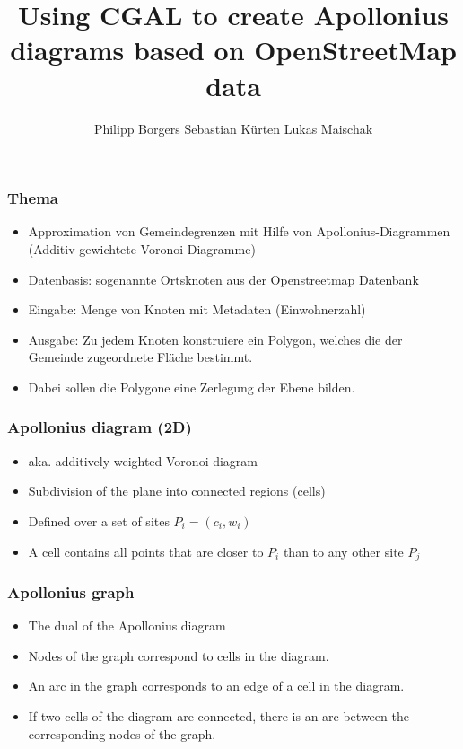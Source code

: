 \documentclass{beamer}
\title{Using CGAL to create Apollonius diagrams based on OpenStreetMap data}
\author[Sebastian Kürten, Philipp Borgers, Lukas Maischak]{
    Philipp Borgers
    \newline Sebastian Kürten
    \newline Lukas Maischak
}
\begin{document}
\begin{frame}
    \titlepage
\end{frame}

\begin{frame}
    \frametitle{Thema}
    \begin{itemize}
        \item Approximation von Gemeindegrenzen mit Hilfe von Apollonius-Diagrammen
        (Additiv gewichtete Voronoi-Diagramme)
        \item Datenbasis: sogenannte Ortsknoten aus der Openstreetmap Datenbank
        \item Eingabe: Menge von Knoten mit Metadaten (Einwohnerzahl)
        \item Ausgabe: Zu jedem Knoten konstruiere ein Polygon, welches die der Gemeinde
        zugeordnete Fläche bestimmt.
        \item Dabei sollen die Polygone eine Zerlegung der Ebene bilden.
    \end{itemize}
\end{frame}

\begin{frame}
    \frametitle{Apollonius diagram (2D)}
    \begin{itemize}
        \item aka. additively weighted Voronoi diagram
        \item Subdivision of the plane into connected regions (cells)
        \item Defined over a set of sites $P_i = (c_i, w_i)$
        \item A cell contains all points that are closer to $P_i$ than to any
            other site $P_j$
    \end{itemize}
\end{frame}

\begin{frame}
    \frametitle{Apollonius graph}
    \begin{itemize}
        \item The dual of the Apollonius diagram
        \item Nodes of the graph correspond to cells in the diagram.
        \item An arc in the graph corresponds to an edge of a cell in the diagram.
        \item If two cells of the diagram are connected, there is an arc between
        the corresponding nodes of the graph.

    \end{itemize}
\end{frame}
\end{document}

